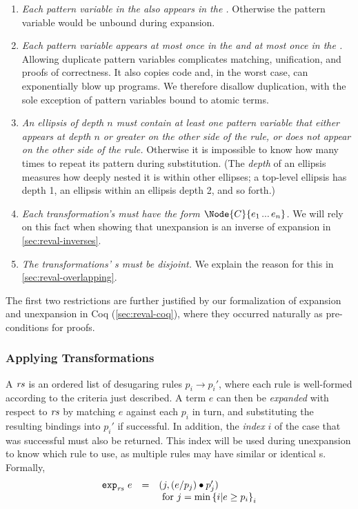 \begin{enumerate}
\item \emph{Each pattern variable in the  also appears in the
  .} Otherwise the pattern variable would be unbound during expansion.
\item \emph{Each pattern variable appears at most once in the  and at
  most once in the .}
  Allowing duplicate pattern variables complicates matching, unification,
  and proofs of correctness. It also copies code
  and, in the worst case, can exponentially blow up programs.
  We therefore disallow duplication,
  with the sole exception of pattern variables bound to atomic terms.
\item \emph{An ellipsis of depth $n$ must contain at least one pattern variable
  that either appears at depth $n$ or greater on the other side of the
  rule, or does not appear on the other side of the rule.} Otherwise it is
  impossible to know how many times to repeat its pattern during
  substitution. (The \emph{depth} of an ellipsis measures how deeply nested
  it is within other ellipses; a top-level ellipsis has depth 1, an
  ellipsis within an ellipsis depth 2, and so forth.)
\item \emph{Each transformation's  must have the form
  $\Node{C}{e_1 \dd e_n}$.} We will rely on this fact when showing that
  unexpansion is an inverse of expansion in \cref{sec:reval-inverses}.
\item \emph{The transformations' s must be disjoint.} We
  explain the reason for this in \cref{sec:reval-overlapping}.
\end{enumerate}
The first two restrictions are further justified by our formalization of
expansion and unexpansion in Coq (\cref{sec:reval-coq}), 
where they occurred naturally as pre-conditions
for proofs.

\subsubsection{Applying Transformations}

A \emph{} $\mathit{rs}$ is an ordered list of desugaring
rules $p_i \to p_i'$, where each rule is well-formed according to the
criteria just described.
A term $e$ can then be \emph{expanded} with respect to
$\mathit{rs}$ by matching $e$ against each $p_i$ in turn, and substituting
the resulting bindings into $p_i'$ if successful. In addition, the
\emph{index} $i$ of the case that was successful
must also be returned. This index will be used during unexpansion
to know which rule to use, as multiple rules may have similar or identical
s. Formally,
\[\begin{array}{lllll}
   \texttt{exp}_{\mathit{rs}}\ {e} &=&
    (j, (e / p_j) \bullet p_j') \\
    &&\text{ for }
      j = \min \left\{ i | e \geq p_i \right\}_i \\
\end{array}\]

